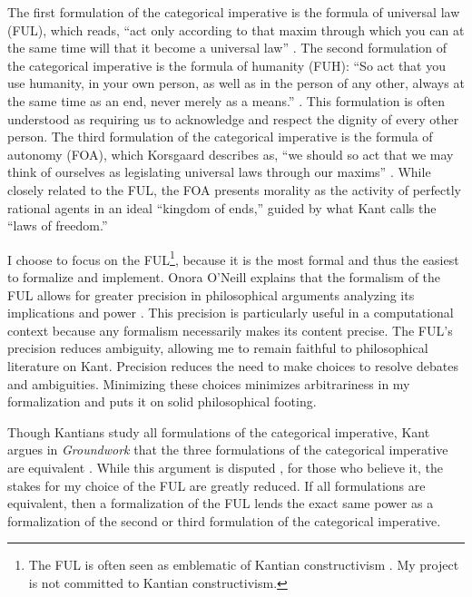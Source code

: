 \begin{isabellebody}
\begin{isamarkuptext}
The first formulation of the categorical imperative is the
formula of universal law (FUL), which reads, ``act only according to that maxim through which you can 
at the same time will that it become a universal law'' \citep[34]{groundwork}. The 
second formulation of the categorical imperative is the formula of humanity (FUH): ``So act that you use humanity, 
in your own person, as well as in the person of any other, always at the same time as an end, never merely 
as a means.'' \cite[41]{groundwork}. This formulation is often understood as requiring us to 
acknowledge and respect the dignity of every other person. The third formulation of the categorical 
imperative is the formula of autonomy (FOA), which Korsgaard describes
as, ``we should so act that we may think of ourselves as legislating universal laws through our 
maxims'' \cite[28]{korsgaardintro}. While closely related to the FUL, the FOA presents morality as the activity of 
perfectly rational agents in an ideal ``kingdom of ends,'' guided by what Kant calls the ``laws of freedom.''

I choose to focus on the FUL\footnote{The FUL is often seen as emblematic of Kantian constructivism \cite[173]{ebelsduggan}. 
My project is not committed to Kantian constructivism.}, because it is the most formal and thus the 
easiest to formalize and implement. Onora O'Neill explains that the formalism of the FUL allows 
for greater precision in philosophical arguments analyzing its implications and power \cite[33]{actingonprinciple}. This precision 
is particularly useful in a computational context because any formalism necessarily makes its content 
precise. The FUL's precision reduces ambiguity, allowing me to remain faithful to philosophical
literature on Kant. Precision reduces the need to make choices to resolve debates 
and ambiguities. Minimizing these choices minimizes 
arbitrariness in my formalization and puts it on solid philosophical footing.

Though Kantians study all formulations of the categorical imperative, Kant argues in \emph{Groundwork} 
that the three formulations of the categorical imperative are equivalent \citep{groundwork}. While this 
argument is disputed \cite{sepkant}, for those who believe it, the
stakes for my choice of the FUL are greatly reduced. If all formulations are equivalent, then a formalization of the FUL
lends the exact same power as a formalization of the second or third formulation of the categorical 
imperative. 


\end{isamarkuptext}
\end{isabellebody}
